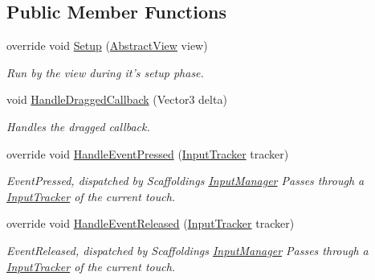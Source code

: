\subsection*{Public Member Functions}
\begin{DoxyCompactItemize}
\item 
override void \hyperlink{class_scaffolding_1_1_drag_this_input_afb612ddc8d089c8708494b57063b235d}{Setup} (\hyperlink{class_scaffolding_1_1_abstract_view}{Abstract\+View} view)
\begin{DoxyCompactList}\small\item\em Run by the view during it's setup phase. \end{DoxyCompactList}\item 
void \hyperlink{class_scaffolding_1_1_drag_this_input_a5de83a69a0b5052b9d162dcf397e5684}{Handle\+Dragged\+Callback} (Vector3 delta)
\begin{DoxyCompactList}\small\item\em Handles the dragged callback. \end{DoxyCompactList}\item 
override void \hyperlink{class_scaffolding_1_1_drag_this_input_a09639007081a6fee7bb7141ec5fa32a5}{Handle\+Event\+Pressed} (\hyperlink{class_scaffolding_1_1_input_tracker}{Input\+Tracker} tracker)
\begin{DoxyCompactList}\small\item\em Event\+Pressed, dispatched by Scaffoldings \hyperlink{class_scaffolding_1_1_input_manager}{Input\+Manager} Passes through a \hyperlink{class_scaffolding_1_1_input_tracker}{Input\+Tracker} of the current touch. \end{DoxyCompactList}\item 
override void \hyperlink{class_scaffolding_1_1_drag_this_input_a9da2ff31ce625e9880e6f47cd8617c6a}{Handle\+Event\+Released} (\hyperlink{class_scaffolding_1_1_input_tracker}{Input\+Tracker} tracker)
\begin{DoxyCompactList}\small\item\em Event\+Released, dispatched by Scaffoldings \hyperlink{class_scaffolding_1_1_input_manager}{Input\+Manager} Passes through a \hyperlink{class_scaffolding_1_1_input_tracker}{Input\+Tracker} of the current touch. \end{DoxyCompactList}\end{DoxyCompactItemize}
